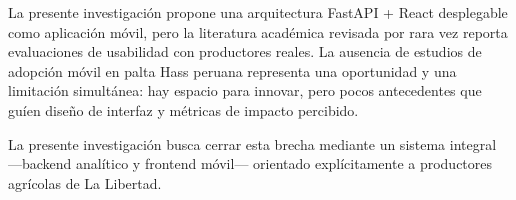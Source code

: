La presente investigaci\'on propone una arquitectura FastAPI + React desplegable como aplicaci\'on m\'ovil, pero la literatura acad\'emica revisada por \citet{Theofilou2025} rara vez reporta evaluaciones de usabilidad con productores reales. La ausencia de estudios de adopci\'on m\'ovil en palta Hass peruana representa una oportunidad y una limitaci\'on simult\'anea: hay espacio para innovar, pero pocos antecedentes que gu\'ien dise\~no de interfaz y m\'etricas de impacto percibido.

La presente investigaci\'on busca cerrar esta brecha mediante un sistema integral ---backend anal\'itico y frontend m\'ovil--- orientado expl\'icitamente a productores agr\'icolas de La Libertad.
